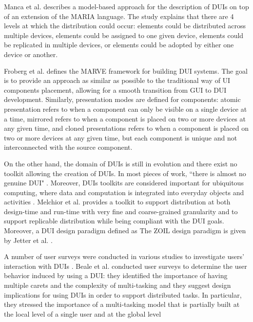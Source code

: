 Manca et al. \cite{manca2011distributing} describes a model-based approach for
the description of DUIs on top of an extension of the MARIA language. The study
explains that there are 4 levels at which the distribution could occur: elements could be
distributed across multiple devices, elements could be assigned to one given
device, elements could be replicated in multiple devices, or elements could be
adopted by either one device or another.\par
Froberg et al. \cite{froberg2011model} defines the MARVE framework for building
DUI systems. The goal is to provide an approach as similar as possible to
the traditional way of UI components placement, allowing for a smooth
transition from GUI to DUI development. Similarly, presentation modes are defined for
components: atomic presentation refers to when a component can only be
visible on a single device at a time, mirrored refers to when a component is
placed on two or more devices at any given time, and cloned presentations refers
to when a component is placed on two or more devices at any given time, but each
component is unique and not interconnected with the source component.\par
On the other hand, the domain of DUIs is still in
evolution and there exist no toolkit allowing the creation of DUIs.
In most pieces of work, ``there is almost no genuine
DUI" \cite{melchior2011distribution}. Moreover, DUIs toolkits are
considered important for ubiquitous computing, where data and computation is
integrated into everyday objects and
activities \cite{elmqvist2011distributed}. Melchior et al.
\cite{melchior69toolkit} provides a toolkit to support distribution at both
design-time and run-time with very fine and coarse-grained granularity and to
support replicable distribution while being compliant with the DUI goals.
Moreover, a DUI design paradigm defined as The ZOIL design paradigm is given by
Jetter et al. \cite{jetter2012design}.\par
A number of user surveys were conducted in various studies to investigate users'
interaction with DUIs \cite{vanderdonckt2010distributed}. Beale et al.
\cite{beale2007multiple} conducted user surveys to determine the user behavior induced by using a DUI:
they identified the importance of having multiple carets and the complexity of multi-tasking and they suggest design implications for using DUIs in order to support distributed
tasks. In particular, they stressed the importance of a multi-tasking model that
is partially built at the local level of a single user and at the global level
